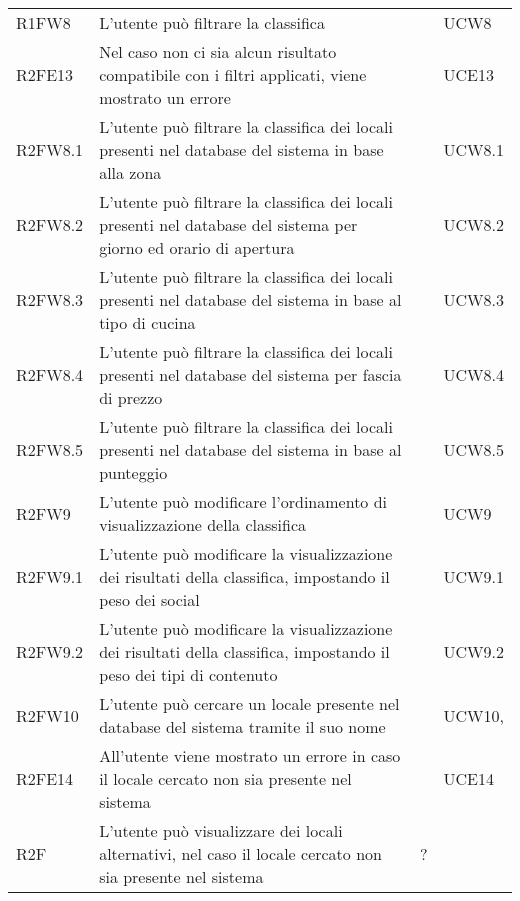 \begin{longtable}{ m{}<{\centering}  m{}<{\centering}  m{}<{\centering}  m{}<{\centering}}
	R1FW8 & L’utente può filtrare la classifica & \Ob & UCW8\\		
	
	R2FE13 & Nel caso non ci sia alcun risultato compatibile con i filtri applicati, viene mostrato un errore & \De & UCE13\\	
	 
	R2FW8.1 & L’utente può filtrare la classifica dei locali presenti nel database del sistema in base alla zona & \De & UCW8.1\\	
	 
	R2FW8.2 & L’utente può filtrare la classifica dei locali presenti nel database del sistema per giorno ed orario di apertura & \De & UCW8.2\\	
	 
	R2FW8.3 & L’utente può filtrare la classifica dei locali presenti nel database del sistema in base al tipo di cucina & \De & UCW8.3\\	
	 
	R2FW8.4 & L’utente può filtrare la classifica dei locali presenti nel database del sistema per fascia di prezzo & \De & UCW8.4\\	 
	 
	R2FW8.5 & L’utente può filtrare la classifica dei locali presenti nel database del sistema in base al punteggio & \De & UCW8.5\\	 
	 
	R2FW9 & L’utente può modificare l’ordinamento di visualizzazione della classifica & \De & UCW9\\	
	 
	R2FW9.1 & L’utente può modificare la visualizzazione dei risultati della classifica, impostando il peso dei social & \De & UCW9.1\\	 
	 
	R2FW9.2 & L’utente può modificare la visualizzazione dei risultati della classifica, impostando il peso dei tipi di contenuto & \De & UCW9.2\\	  
	 
	R2FW10 & L’utente può cercare un locale presente nel database del sistema tramite il suo nome & \Ob & UCW10, \Di \\	 
	 
	R2FE14 & All’utente viene mostrato un errore in caso il locale cercato non sia presente nel sistema & \De & UCE14\\	 
	 
	R2F & L’utente può visualizzare dei locali alternativi, nel caso il locale cercato non sia presente nel sistema & \De ? & \Di \\	 
	 

\end{longtable}
